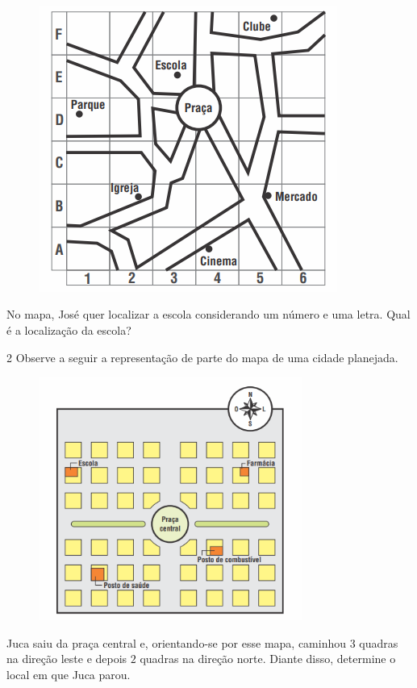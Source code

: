 \begin{figure}[H]
\centering\includegraphics[width=3.86042in,height=3.68611in]{./imgSAEB_6_MAT/media/image64.png}
\end{figure}

No mapa, José quer localizar a escola considerando um número e uma letra.
Qual é a localização da escola?


\num{2}  Observe a seguir a representação de parte do mapa de uma cidade
planejada.

\begin{figure}[H]
\centering\includegraphics[width=3.39535in,height=3.14326in]{./imgSAEB_6_MAT/media/image65.png}
\end{figure}

Juca saiu da praça central e, orientando-se por esse mapa, caminhou $3$
quadras na direção leste e depois $2$ quadras na direção norte. Diante disso,
determine o local em que Juca parou.

